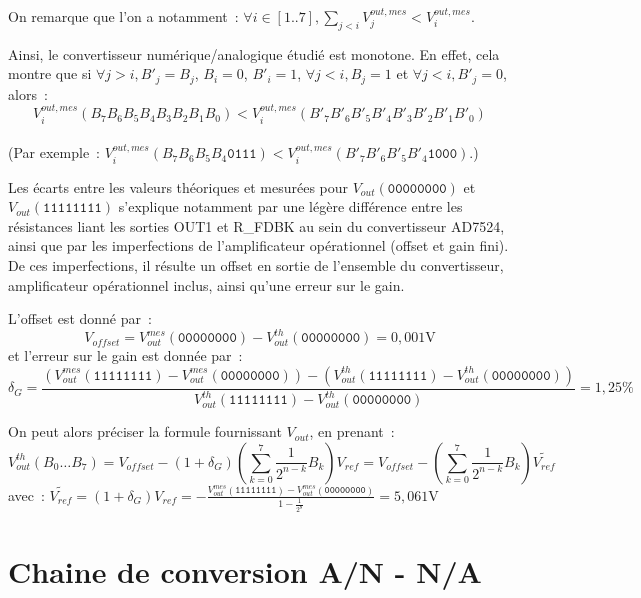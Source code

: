 \documentclass{article}
\begin{document}
On remarque que l'on a notamment~: $\forall i\in [1..7], \sum_{j<i}V_j^{out,mes} < V_i^{out,mes}$.

Ainsi, le convertisseur numérique/analogique étudié est monotone. En effet, cela montre que si ${\forall j>i, B'_j=B_j}$, $B_i=0$, $B'_i=1$, ${\forall j<i, B_j=1}$ et ${\forall j<i, B'_j=0}$, alors~: \begin{equation*}V_i^{out,mes}(B_7B_6B_5B_4B_3B_2B_1B_0) < V_i^{out,mes}(B'_7B'_6B'_5B'_4B'_3B'_2B'_1B'_0)\end{equation*} \\(Par exemple~: $V_i^{out,mes}(B_7B_6B_5B_4\mathtt{0111}) < V_i^{out,mes}(B'_7B'_6B'_5B'_4\mathtt{1000})$.)

Les écarts entre les valeurs théoriques et mesurées pour $V_{out}(\mathtt{00000000})$ et $V_{out}(\mathtt{11111111})$ s'explique notamment par une légère différence entre les résistances liant les sorties OUT1 et R\_FDBK au sein du convertisseur AD7524, ainsi que par les imperfections de l'amplificateur opérationnel (offset et gain fini). De ces imperfections, il résulte un offset en sortie de l'ensemble du convertisseur, amplificateur opérationnel inclus, ainsi qu'une erreur sur le gain.

L'offset est donné par~: 
\begin{equation*}
V_{offset}=V_{out}^{mes}(\mathtt{00000000})-V_{out}^{th}(\mathtt{00000000})=0,001\mathrm{V}
\end{equation*}
et l'erreur sur le gain est donnée par~:
\begin{equation*}
\delta_G=\frac{(V_{out}^{mes}(\mathtt{11111111})-V_{out}^{mes}(\mathtt{00000000}))-(V_{out}^{th}(\mathtt{11111111})-V_{out}^{th}(\mathtt{00000000}))}{V_{out}^{th}(\mathtt{11111111})-V_{out}^{th}(\mathtt{00000000})}=1,25\mathrm{\%}
\end{equation*}

On peut alors préciser la formule fournissant $V_{out}$, en prenant~:
\begin{equation*}
V_{out}^{th}(B_0\dots B_7) = V_{offset}-(1+\delta_G)\left(\sum_{k=0}^{7}\frac{1}{2^{n-k}}B_k\right)V_{ref} = V_{offset}-\left(\sum_{k=0}^{7}\frac{1}{2^{n-k}}B_k\right)\widetilde{V_{ref}}
\end{equation*}
avec~: $\widetilde{V_{ref}} = (1+\delta_G)V_{ref} = -\frac{V_{out}^{mes}(\mathtt{11111111})-V_{out}^{mes}(\mathtt{00000000})}{1-\frac{1}{2^8}} = 5,061\mathrm{V}$



\section{Chaine de conversion A/N - N/A}
\end{document}
